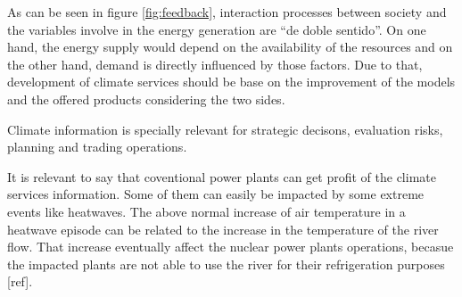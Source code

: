 
As can be seen in figure \ref{fig:feedback}, interaction processes between society and the variables involve in the energy generation are ``de doble sentido''. On one hand, the energy supply would depend on the availability of the resources and on the other hand, demand is directly influenced by those factors. Due to that, development of climate services should be base on the improvement of the models and the offered products considering the two sides.   


Climate information is specially relevant for strategic decisons, evaluation risks, planning and trading operations.


It is relevant to say that coventional power plants can get profit of the climate services information. Some of them can easily be impacted by some extreme events like heatwaves. The above normal increase of air temperature in a heatwave episode can be related to the increase in the temperature of the river flow. That increase eventually affect the nuclear power plants operations, becasue the impacted plants are not able to use the river for their refrigeration purposes [ref].   

